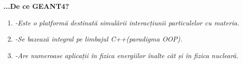\documentclass[xcolor=rgb]{beamer}
\begin{document}
\begin{frame}


 \vspace*{2.0cm} %

 \textbf{...De ce GEANT4?} 
\begin{enumerate}
  \item \textit{-Este o platformă destinată simulării interacțiunii particulelor cu materia.}
  \item \textit{-Se bazează integral pe limbajul C++(paradigma OOP).}
  \item \textit{-Are numeroase aplicații în fizica energiilor înalte cât și în fizica nucleară.}
\end{enumerate}
\end{frame}
\end{document}
